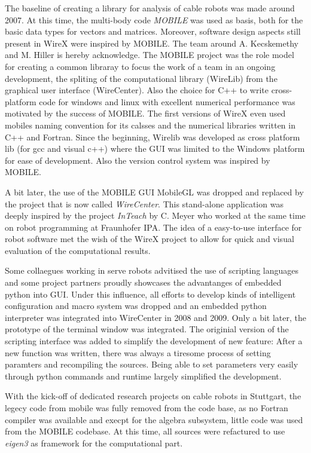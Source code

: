 \documentclass[11pt,a4paper,onepage,openany]{book}
\begin{document}
The baseline of creating a library for analysis of cable robots was made around 2007. 
At this time, the multi-body code \emph{MOBILE} was used as basis, both for the basic
data types for vectors and matrices. Moreover, software design aspects still present in 
WireX were inspired by MOBILE. The team around A. Kecskemethy and M. Hiller is hereby 
acknowledge. The MOBILE project was the role model for creating a common libraray to 
focus the work of a team in an ongoing development, the spliting of the computational
library (WireLib) from the graphical user interface (WireCenter). Also the choice for C++ 
to write cross-platform code for windows and linux with excellent numerical performance 
was motivated by the success of MOBILE. The first versions of WireX even used mobiles 
naming convention for its calsses and the numerical libraries written in C++ and Fortran.
Since the beginning, Wirelib was developed as cross platform lib (for gcc and visual c++) 
where the GUI was limited to the Windows platform for ease of development. Also the version 
control system was inspired by MOBILE.

A bit later, the use of the MOBILE GUI MobileGL was dropped and replaced by the project 
that is now called \emph{WireCenter}. This stand-alone application was deeply inspired by
the project \emph{InTeach} by C. Meyer who worked at the same time on robot programming at
Fraunhofer IPA. The idea of a easy-to-use interface for robot software met the wish of the
WireX project to allow for quick and visual evaluation of the computational results.

Some collaegues working in serve robots advitised the use of scripting languages and some 
project partners proudly showcases the advantanges of embedded python into GUI. Under this influence,
all efforts to develop kinds of intelligent configuration and macro system was dropped and
an embedded python interpreter was integrated into WireCenter in 2008 and 2009. Only a bit later, 
the prototype of the terminal window was integrated. The originial version of the scripting 
interface was added to simplify the development of new feature: After a new function was written, there was
always a tiresome process of setting paramters and recompiling the sources. Being able to
set parameters very easily through python commands and runtime largely simplified the development.

With the kick-off of dedicated research projects on cable robots in Stuttgart, the legecy code
from mobile was fully removed from the code base, as no Fortran compiler was available and
execpt for the algebra subsystem, little code was used from the MOBILE codebase. At this time,
all sources were refactured to use \emph{eigen3} as framework for the computational part.
\end{document}
